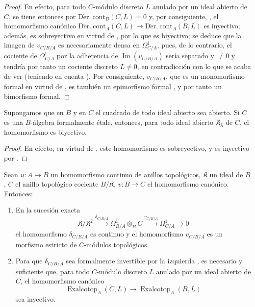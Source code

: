 \begin{proof}
En efecto, para todo $C$-módulo discreto $L$ anulado por un ideal abierto de $C$,
se tiene entonces por 
$\operatorname{D\acute{e}r.\ cont}_B(C,L)=0$ y, por consiguiente,
, el homomorfismo canónico
$\operatorname{D\acute{e}r.\ cont}_A(C,L)\to
\operatorname{D\acute{e}r.\ cont}_A(B,L)$ es inyectivo; además, es
sobreyectivo en virtud de , por lo que es biyectivo; se deduce
que la imagen de $v_{C/B/A}$ es necesariamente densa en $\Omega^1_{C/A}$,
pues, de lo contrario, el cociente de $\Omega^1_{C/A}$ por la adherencia de
$\operatorname{Im}(v_{C/B/A})$ sería separado y $\neq0$ y tendría por tanto un
cociente discreto $L\neq0$, en contradicción con lo que se acaba de ver
(teniendo en cuenta ). Por consiguiente, $v_{C/B/A}$, que es un
monomorfismo formal en virtud de , es también un epimorfismo formal
, y por tanto un bimorfismo formal.
\end{proof}

\begin{corollary}[20.7.7]
\label{0.20.7.7-fr}
Supongamos que en $B$ y en $C$ el cuadrado de todo ideal abierto sea abierto.
Si $C$ es una $B$-álgebra formalmente étale, entonces, para todo ideal abierto
$\mathfrak{K}_\lambda$ de $C$, el homomorfismo \textup{} es
biyectivo.
\end{corollary}

\begin{proof}
En efecto, en virtud de , este homomorfismo es sobreyectivo, y
es inyectivo por .
\end{proof}

\begin{proposition}[20.7.8]
\label{0.20.7.8-fr}
Sean $u:A\to B$ un homomorfismo continuo de anillos topológicos,
$\mathfrak{K}$ un ideal de $B$, $C$ el anillo topológico cociente
$B/\mathfrak{K}$, $v:B\to C$ el homomorfismo canónico. Entonces:
\begin{enumerate}
  \item[\rm(i)] En la sucesión exacta \textup{}
\[
  \mathfrak{K}/\mathfrak{K}^2\xrightarrow{\delta_{C/B/A}}
  \Omega^1_{B/A}\otimes_B C\xrightarrow{v_{C/B/A}}\Omega^1_{C/A}\to0
\]
el homomorfismo $\delta_{C/B/A}$ es continuo y el homomorfismo $v_{C/B/A}$
es un morfismo estricto de $C$-módulos topológicos.
  \item[\rm(ii)] Para que $\delta_{C/B/A}$ sea formalmente invertible por la
izquierda \textup{}, es necesario y suficiente que, para todo $C$-módulo
discreto $L$ anulado por un ideal abierto de $C$, el homomorfismo canónico
\begin{equation}
\tag{20.7.8.1}
\label{0.20.7.8.1-fr}
  \operatorname{Exalcotop}_A(C,L)\to\operatorname{Exalcotop}_A(B,L)
\end{equation}
sea inyectivo.
\end{enumerate}
\end{proposition}

